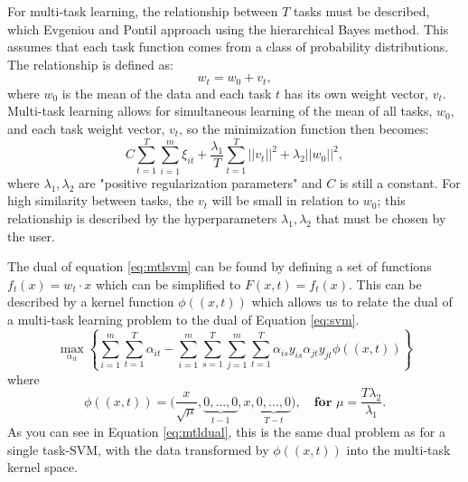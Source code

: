 \documentclass{llncs}
\begin{document}
For multi-task learning, the relationship between $T$ tasks must be described, which Evgeniou and Pontil approach using the hierarchical Bayes method. This assumes that each task function comes from a class of probability distributions.  The relationship is defined as:\\
\begin{equation}
\label{eq:sim}
 w_t = w_0 + v_t ,
\end{equation}
where $w_0$ is the mean of the data and each task $t$ has its own weight vector, $v_t$. Multi-task learning allows for simultaneous learning of the mean of all tasks, $w_0$, and each task weight vector, $v_t$, so the minimization function then becomes:\\
\begin{equation}
\label{eq:mtlsvm}
 C \sum_{t=1}^T \sum_{i=1}^m \xi_{it} + \frac{\lambda_1}{T} \sum_{t=1}^T ||v_t||^2 + \lambda_2||w_0||^2 ,
\end{equation}
where $\lambda_1, \lambda_2$ are "positive regularization parameters" and $C$ is still a constant.  For high similarity between tasks, the $v_t$ will be small in relation to $w_0$; this relationship is described by the hyperparameters $\lambda_1, \lambda_2$ that must be chosen by the user.

The dual of equation \ref{eq:mtlsvm} can be found by defining a set of functions $f_t(x) = w_t \cdot x$ which can be simplified to $F(x,t) = f_t(x)$.  This can be described by a kernel function $\phi((x,t))$ which allows us to relate the dual of a multi-task learning problem to the dual of Equation \ref{eq:svm}.
\begin{equation}
\label{eq:mtldual}
\max_{\alpha_{it}}  \left\{ \sum_{i=1}^m\sum_{t=1}^T \alpha_{it} -  \sum_{i=1}^m\sum_{s=1}^T\sum_{j=1}^m\sum_{t=1}^T  \alpha_{is}y_{is}\alpha_{jt}y_{jt}\phi((x,t))      \right\}
\end{equation}
where
\begin{equation}
\phi((x,t)) = \big(\frac{x}{\sqrt{\mu}}, \underbrace{0,...,0}_{t-1}, x, \underbrace{0,...,0}_{T-t} \big), \quad \textbf{for  } \mu = \frac{T\lambda_2}{\lambda_1} .
\end{equation}
As you can see in Equation \ref{eq:mtldual}, this is the same dual problem as for a single task-SVM, with the data transformed by $\phi((x,t))$ into the multi-task kernel space.
\end{document}
